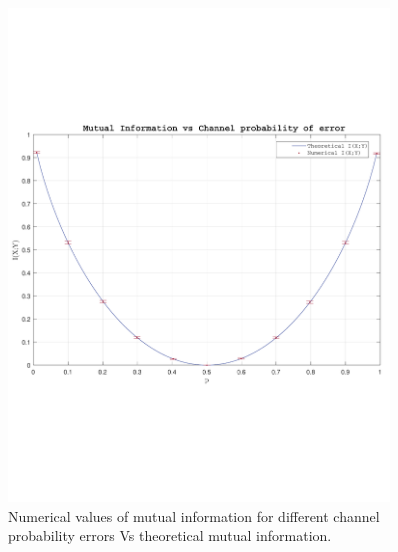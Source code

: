 \begin{refsection}
\begin{figure}[h]
    \centering
        \includegraphics[clip, trim=0.05cm 6cm 0.5cm 6cm, width=0.90\textwidth]{./sdf/eit_87071_mutual_information_estimator/figures/fig2.pdf}
    \caption{Numerical values of mutual information for different channel probability errors Vs theoretical mutual information.}\label{fig:theornum}
\end{figure}




\clearpage
\printbibliography[heading=subbibliography]
\end{refsection}
\cleardoublepage
